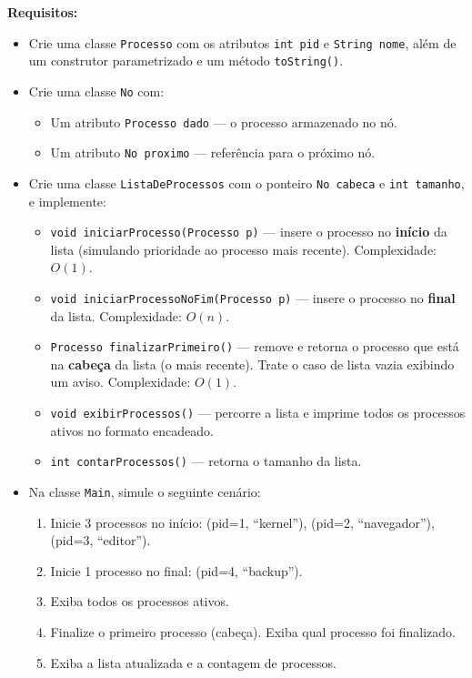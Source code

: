 \documentclass[12pt, a4paper]{article}
\begin{document}
\textbf{Requisitos:}
\begin{itemize}
    \item Crie uma classe \texttt{Processo} com os atributos \texttt{int pid} e \texttt{String nome}, além de um construtor parametrizado e um método \texttt{toString()}.
    \item Crie uma classe \texttt{No} com:
    \begin{itemize}
        \item Um atributo \texttt{Processo dado} — o processo armazenado no nó.
        \item Um atributo \texttt{No proximo} — referência para o próximo nó.
    \end{itemize}
    \item Crie uma classe \texttt{ListaDeProcessos} com o ponteiro \texttt{No cabeca} e \texttt{int tamanho}, e implemente:
    \begin{itemize}
        \item \texttt{void iniciarProcesso(Processo p)} — insere o processo no \textbf{início} da lista (simulando prioridade ao processo mais recente). Complexidade: $O(1)$.
        \item \texttt{void iniciarProcessoNoFim(Processo p)} — insere o processo no \textbf{final} da lista. Complexidade: $O(n)$.
        \item \texttt{Processo finalizarPrimeiro()} — remove e retorna o processo que está na \textbf{cabeça} da lista (o mais recente). Trate o caso de lista vazia exibindo um aviso. Complexidade: $O(1)$.
        \item \texttt{void exibirProcessos()} — percorre a lista e imprime todos os processos ativos no formato encadeado.
        \item \texttt{int contarProcessos()} — retorna o tamanho da lista.
    \end{itemize}
    \item Na classe \texttt{Main}, simule o seguinte cenário:
    \begin{enumerate}
        \item Inicie 3 processos no início: (pid=1, ``kernel''), (pid=2, ``navegador''), (pid=3, ``editor'').
        \item Inicie 1 processo no final: (pid=4, ``backup'').
        \item Exiba todos os processos ativos.
        \item Finalize o primeiro processo (cabeça). Exiba qual processo foi finalizado.
        \item Exiba a lista atualizada e a contagem de processos.
    \end{enumerate}
\end{itemize}
\end{document}
